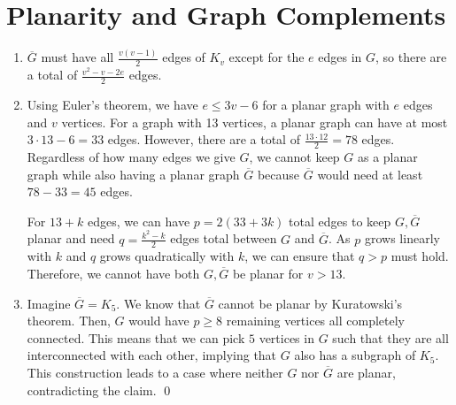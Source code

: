 \documentclass{article}
\begin{document}
	\section{Planarity and Graph Complements}
	\begin{enumerate}[label=\alph*.]
		\item $\overline G$ must have all $\frac{v(v-1)}{2}$ edges of $K_v$ except 
		for the $e$ edges in $G$, so there are a total of $\boxed{\frac{v^2-v-2e}{2}}$ edges.
		\item Using Euler's theorem, we have $e \leq 3v - 6$ for a planar graph with $e$ edges 
		and $v$ vertices. For a graph with 13 vertices, 
		a planar graph can have at most $3 \cdot 13 - 6 = 33$ edges. However, there are 
		a total of $\frac{13 \cdot 12}{2} = 78$ edges. Regardless of how many edges we 
		give $G$, we cannot keep $G$ as a planar graph while also having a planar graph $\overline G$
		because $\overline G$ would need at least $78-33 = 45$ edges.

		For $13 + k$ edges, we can have $p = 2(33 + 3k)$ total edges to keep $G, \overline G$ planar and need
		$q = \frac{k^2-k}{2}$ edges total between $G$ and $\overline G$. As $p$ grows 
		linearly with $k$ and $q$ grows quadratically with $k$, we can ensure that $q > p$ must hold.
		Therefore, we cannot have both $G, \overline G$ be planar for $v > 13$.
		\item Imagine $\overline G = K_5$. We know that $\overline G$ cannot be planar 
		by Kuratowski's theorem. Then, $G$ would have $p \geq 8$ remaining vertices all completely connected. 
		This means that we can pick $5$ vertices in $G$ such that they are all interconnected
		with each other, implying that $G$ also has a subgraph of $K_5$. This construction 
		leads to a case where neither $G$ nor $\overline G$ are planar, contradicting the claim. \qed
	\end{enumerate}
\end{document}
